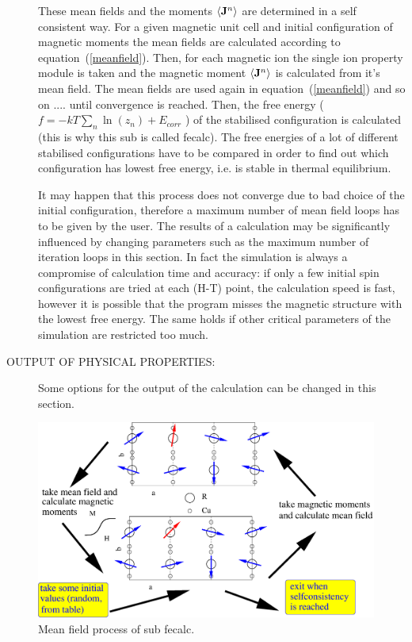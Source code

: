 \begin{description}
These mean fields and the moments $\langle \mathbf J^n \rangle$ 
are determined in a self consistent
way. For a given magnetic unit cell and initial configuration 
of magnetic moments
the mean fields are calculated according to equation~(\ref{meanfield}). 
Then, for each
magnetic ion the single ion property module is taken 
and the magnetic moment $\langle \mathbf J^n \rangle$ is 
calculated from it's mean field. The mean fields are used again in equation~(\ref{meanfield})
and so on .... until convergence is reached. 
Then, the free energy ($f=-kT\sum_n \ln(z_n) + E_{corr}$ ) 
of the stabilised
configuration is calculated (this is why this sub is called {\prg fecalc}). 
The free energies of a lot of different stabilised configurations have to
be compared in order to find out which configuration has lowest free energy, i.e.
is stable in thermal  equilibrium.

It may happen that this process does
not converge due to bad choice of the initial configuration, therefore a maximum number
of mean field loops has to be given by the user.
The results of a calculation may be significantly influenced by
changing parameters such as the maximum number of iteration loops 
in this section. 
In fact the simulation is always a compromise of calculation time and accuracy: if only
a few initial spin configurations are tried at each (H-T) point, the calculation speed is
fast, however it is possible that the program misses the magnetic structure with the
lowest free energy. The same holds if other critical parameters of the simulation are
restricted too much.
 

\item [OUTPUT OF PHYSICAL PROPERTIES:]
Some options for the output of the calculation can be changed in this section.
\end{description}

\begin{figure}[hb]
\includegraphics[angle=0,width=0.9\columnwidth]{figsrc/fecalc.eps}
\caption{\label{fecalc}Mean field process of sub {\prg fecalc}.}
\end{figure}

